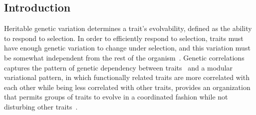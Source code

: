 \begin{refsection}


\section{Introduction}

Heritable genetic variation determines a trait's evolvability, defined as the
ability to respond to selection. In order to efficiently respond to selection,
traits must have enough genetic variation to change under selection, and this
variation must be somewhat independent from the rest of the
organism~\parencite{Lewontin1979-iw}. Genetic correlations captures the
pattern of genetic dependency between traits~\parencite{Lande1979-by,
Lande1983-ez} and a modular variational pattern, in which functionally related
traits are more correlated with each other while being less correlated with other traits,
provides an organization that permits groups of traits to evolve in a
coordinated fashion while not disturbing other traits~\parencite{Olson1958-qk,
Cheverud1996-jw, Wagner2007-cx, Melo2016-yw}.


\end{refsection}
